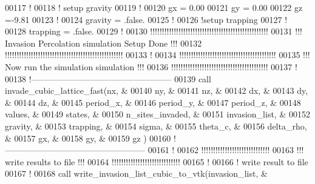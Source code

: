 \begin{DoxyCode}
00117 \textcolor{comment}{!}
00118 \textcolor{comment}{! setup gravity}
00119 \textcolor{comment}{!}
00120 gx = 0.00
00121 gy = 0.00
00122 gz =-9.81
00123 \textcolor{comment}{!}
00124 gravity = .false.
00125 \textcolor{comment}{!}
00126 \textcolor{comment}{!setup trapping}
00127 \textcolor{comment}{!}
00128 trapping = .false.
00129 \textcolor{comment}{!}
00130 \textcolor{comment}{!!!!!!!!!!!!!!!!!!!!!!!!!!!!!!!!!!!!!!!!!!!!!!!!!!}
00131 \textcolor{comment}{!!! Invasion Percolation simulation Setup Done !!!}
00132 \textcolor{comment}{!!!!!!!!!!!!!!!!!!!!!!!!!!!!!!!!!!!!!!!!!!!!!!!!!!}
00133 \textcolor{comment}{!}
00134 \textcolor{comment}{!!!!!!!!!!!!!!!!!!!!!!!!!!!!!!!!!!!!!!!!!}
00135 \textcolor{comment}{!!! Now run the simulation simulation !!!}
00136 \textcolor{comment}{!!!!!!!!!!!!!!!!!!!!!!!!!!!!!!!!!!!!!!!!!}
00137 \textcolor{comment}{!}
00138 \textcolor{comment}{!--------------------------------------------------}
00139 call invade\_cubic\_lattice\_fast(nx,              &
00140                                  ny,              &
00141                                  nz,              &
00142                                  dx,              &
00143                                  dy,              &
00144                                  dz,              &
00145                                  period\_x,        &
00146                                  period\_y,        &
00147                                  period\_z,        &
00148                                  values,          &
00149                                  states,          &
00150                                  n\_sites\_invaded, &
00151                                  invasion\_list,   &
00152                                  gravity,         &
00153                                  trapping,        &
00154                                  sigma,           &
00155                                  theta\_c,         &
00156                                  delta\_rho,       &
00157                                  gx,              &
00158                                  gy,              &
00159                                  gz               )
00160 \textcolor{comment}{!--------------------------------------------------}
00161 \textcolor{comment}{!}
00162 \textcolor{comment}{!!!!!!!!!!!!!!!!!!!!!!!!!!!!!}
00163 \textcolor{comment}{!!! write results to file !!!}
00164 \textcolor{comment}{!!!!!!!!!!!!!!!!!!!!!!!!!!!!!}
00165 \textcolor{comment}{!}
00166 \textcolor{comment}{! write result to file}
00167 \textcolor{comment}{!}
00168 call write\_invasion\_list\_cubic\_to\_vtk(invasion\_list,   &

\end{DoxyCode}
